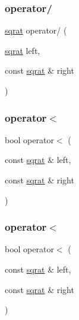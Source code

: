 \mbox{\label{classsqrat_aa6e76248a9ec776743e60e5db8b3cb6d}} 
\subsubsection{\texorpdfstring{operator/}{operator/}\hspace{0.1cm}{\footnotesize\ttfamily [3/3]}}
{\footnotesize\ttfamily \mbox{\hyperlink{classsqrat}{sqrat}} operator/ (\begin{DoxyParamCaption}\item[{\mbox{\hyperlink{classsqrat}{sqrat}}}]{left,  }\item[{const \mbox{\hyperlink{classsqrat}{sqrat}} \&}]{right }\end{DoxyParamCaption})\hspace{0.3cm}{\ttfamily [friend]}}

\mbox{\label{classsqrat_a1326bc7564a14f2fa4cbe59cdcf94b69}} 
\subsubsection{\texorpdfstring{operator$<$}{operator<}\hspace{0.1cm}{\footnotesize\ttfamily [1/3]}}
{\footnotesize\ttfamily bool operator$<$ (\begin{DoxyParamCaption}\item[{const \mbox{\hyperlink{classsqrat}{sqrat}} \&}]{left,  }\item[{const \mbox{\hyperlink{classsqrat}{sqrat}} \&}]{right }\end{DoxyParamCaption})\hspace{0.3cm}{\ttfamily [friend]}}

\mbox{\label{classsqrat_a1326bc7564a14f2fa4cbe59cdcf94b69}} 
\subsubsection{\texorpdfstring{operator$<$}{operator<}\hspace{0.1cm}{\footnotesize\ttfamily [2/3]}}
{\footnotesize\ttfamily bool operator$<$ (\begin{DoxyParamCaption}\item[{const \mbox{\hyperlink{classsqrat}{sqrat}} \&}]{left,  }\item[{const \mbox{\hyperlink{classsqrat}{sqrat}} \&}]{right }\end{DoxyParamCaption})\hspace{0.3cm}{\ttfamily [friend]}}

